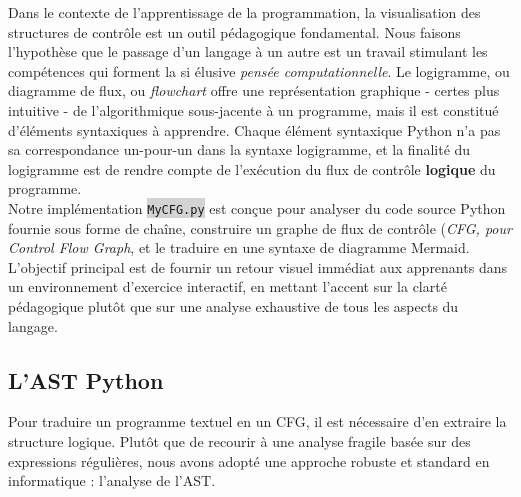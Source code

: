 \documentclass[11pt,a4paper]{article}
\newcommand{\code}[1]{\colorbox{lightgray}{\texttt{\small #1}}}
\begin{document}
Dans le contexte de l'apprentissage de la programmation, la visualisation des structures de contrôle est un 
outil pédagogique fondamental. Nous faisons l'hypothèse que le passage d'un langage à un autre est un travail 
stimulant les compétences qui forment la si élusive \textit{pensée computationnelle}. Le logigramme, ou 
diagramme de flux, ou \textit{flowchart} offre une représentation graphique - certes plus intuitive - de 
l'algorithmique sous-jacente à un programme, mais il est constitué d'éléments syntaxiques à apprendre. 
Chaque élément syntaxique Python n'a pas sa correspondance un-pour-un dans la syntaxe logigramme, et la finalité du logigramme est de rendre compte de l'exécution du flux de contrôle \textbf{logique} du programme. \\
Notre implémentation \code{MyCFG.py} est conçue pour analyser du code source Python fournie sous forme de chaîne, construire un graphe de flux de contrôle (\textit{CFG, pour Control Flow Graph}, et le traduire en une syntaxe de diagramme Mermaid. L'objectif principal est de fournir un retour visuel immédiat aux apprenants dans un environnement d'exercice interactif, en mettant l'accent sur la clarté pédagogique plutôt que sur une analyse exhaustive de tous les aspects du langage.

\subsection{L'AST Python}
Pour traduire un programme textuel en un CFG, il est nécessaire d'en extraire la structure logique. Plutôt que de recourir à une analyse fragile basée sur des expressions régulières, nous avons adopté une approche robuste et standard en informatique : l'analyse de l'AST.
\end{document}
